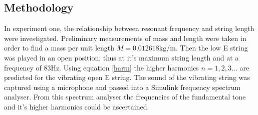\documentclass[12pt]{article}
\begin{document}
        \subsection{Methodology}
            In experiment one, the relationship between resonant frequency and string length were investigated.
            Preliminary measurements of mass and length were taken in order to find a mass per unit length $M = 0.012618\si{\kilogram\per\meter}$.
            Then the low E string was played in an open position, thus at it's maximum string length and at a frequency of $83\si{\hertz}$.
            Using equation \ref{harm} the higher harmonics $n = 1, 2 ,3 ...$ are predicted for the vibrating open E string.
            The sound of the vibrating string was captured using a microphone and passed into a Simulink frequency spectrum analyser.
            From this spectrum analyser the frequencies of the fundamental tone and it's higher harmonics could be ascertained.
            
\end{document}
